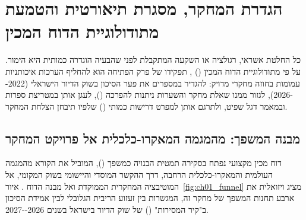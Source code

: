 
\chapter{הגדרת המחקר, מסגרת תיאורטית והטמעת מתודולוגיית הדוח המכין}
\label{ch:framework}

\begin{managerbox}
כל החלטת אשראי, רגולציה או השקעה המתקבלת לפני שהבעיה הוגדרה כמותית היא הימור. על פי מתודולוגיית הדוח המכין () \cite{segal2026prep}, תפקידו של פרק הפתיחה הוא להחליף הערכות איכותניות עמומות בחוזה מחקרי מדויק: להגדיר במספרים את פער הסיכון בשוק הדיור הישראלי (\num{2022--2026}), לגזור ממנו שאלת מחקר והשערות ניתנות להפרכה (), לעגן אותן במטריצת ספרות ובמאמר דגל שפיט, ולתרגם אותן למפרט דרישות כמותי () שלפיו תיבחן הצלחת המחקר.
\end{managerbox}

\section{מבנה המשפך: מהמגמה המאקרו-כלכלית אל פרויקט המחקר}
\label{sec:ch01_funnel}

דוח מכין מקצועי נפתח בסקירה תמטית הבנויה כמשפך (), המוביל את הקורא מהמגמה העולמית והמאקרו-כלכלית הרחבה, דרך ההקשר המוסדי והיישומי בשוק המקומי, אל המוטיבציה המחקרית הממוקדת ואל מבנה הדוח \cite{segal2026prep,ulrich2020product}. איור~\ref{fig:ch01_funnel} מציג ויזואלית את ארבע תחנות המשפך של מחקר זה, המגשרות בין זעזוע הריבית הגלובלי לבין אמידת הסיכון ב"קיר המסירות" () של שוק הדיור בישראל בשנים \num{2026--2027}.

